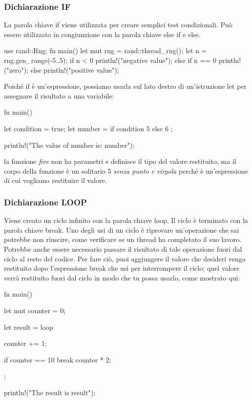 \documentclass[11pt,a4paper]{article}
\begin{document}
\subsubsection{Dichiarazione IF}

La parola chiave if viene utilizzata per creare semplici test condizionali. Può essere utilizzato in
congiunzione con la parola chiave else if e else.
\begin{rust}
use rand::Rng;
fn main() {
	let mut rng = rand::thread_rng();
	let n = rng.gen_range(-5..5);
	if n < 0 {
		println!("negative value");
	} else if n == 0 {
		println!("zero");
	} else {
		println!("positive value");
	}
}
\end{rust}

Poiché if è un'espressione, possiamo usarla sul lato destro di un'istruzione let per assegnare il risultato a una variabile:
\begin{rust}
fn main() {
    let condition = true;
    let number = if condition { 5 } else { 6 };

    println!("The value of number is: {number}");
}
\end{rust}
la funzione \textit{five} non ha parametri e definisce il tipo del valore restituito, ma il corpo della funzione è un solitario 5 \textit{senza punto e virgola} perché è un'espressione di cui vogliamo restituire il valore.

\subsubsection{Dichiarazione LOOP}

Viene creato un ciclo infinito con la parola chiave loop. Il ciclo è terminato con la parola chiave break.
Uno degli usi di un ciclo è riprovare un'operazione che sai potrebbe non riuscire, come verificare se un thread ha completato il suo lavoro. Potrebbe anche essere necessario passare il risultato di tale operazione fuori dal ciclo al resto del codice. Per fare ciò, puoi aggiungere il valore che desideri venga restituito dopo l'espressione break che usi per interrompere il ciclo; quel valore verrà restituito fuori dal ciclo in modo che tu possa usarlo, come mostrato qui:

\begin{rust}
fn main() {
    let mut counter = 0;

    let result = loop {
        counter += 1;

        if counter == 10 {
            break counter * 2;
        }
    };

    println!("The result is {result}");
}
\end{rust}
\end{document}
